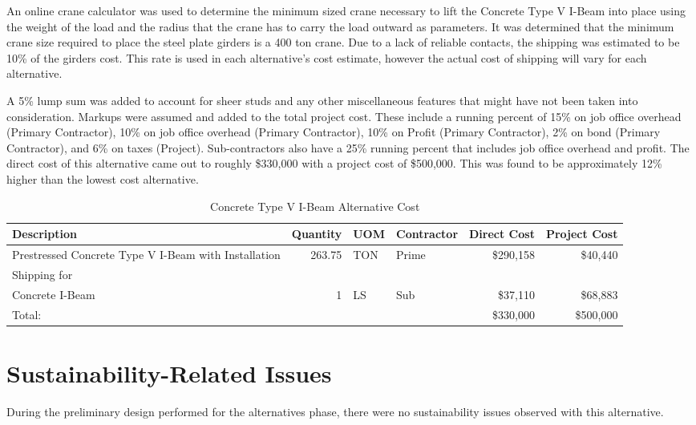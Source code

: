 An online crane calculator was used to determine the minimum sized crane necessary to lift the Concrete Type V I-Beam into place using the weight of the load and the radius that the crane has to carry the load outward as parameters. It was determined that the minimum crane size required to place the steel plate girders is a 400 ton crane. Due to a lack of reliable contacts, the shipping was estimated to be 10\% of the girders cost. This rate is used in each alternative's cost estimate, however the actual cost of shipping will vary for each alternative.

A 5\% lump sum was added to account for sheer studs and any other miscellaneous features that might have not been taken into consideration. Markups were assumed and added to the total project cost. These include a running percent of 15\% on job office overhead (Primary Contractor), 10\% on job office overhead (Primary Contractor), 10\% on Profit (Primary Contractor), 2\% on bond (Primary Contractor), and 6\% on taxes (Project). Sub-contractors also have a 25\% running percent that includes job office overhead and profit. The direct cost of this alternative came out to roughly \$330,000 with a project cost of \$500,000. This was found to be approximately 12\% higher than the lowest cost alternative.

\begin{table}[H]
\centering
\caption{Concrete Type V I-Beam Alternative Cost}
\vspace{0.5cm}
\begin{tabular}{p{3.5cm}rllrr}\toprule\midrule
\textbf{Description}                                 & \textbf{Quantity} & \textbf{UOM}  & \textbf{Contractor} & \textbf{Direct Cost} &\textbf{Project Cost} \\\midrule
Prestressed Concrete Type V I-Beam with Installation & 263.75            & TON           & Prime               & \$290,158            & \$40,440              \\\midrule
Shipping for \\Concrete I-Beam                       & 1                 & LS            & Sub                 & \$37,110             & \$68,883               \\\midrule
Total:                                               &                   &               &                     & \$330,000            & \$500,000               \\\bottomrule
\end{tabular}
\end{table}


\section{Sustainability-Related Issues}
During the preliminary design performed for the alternatives phase, there were no sustainability issues observed with this alternative.